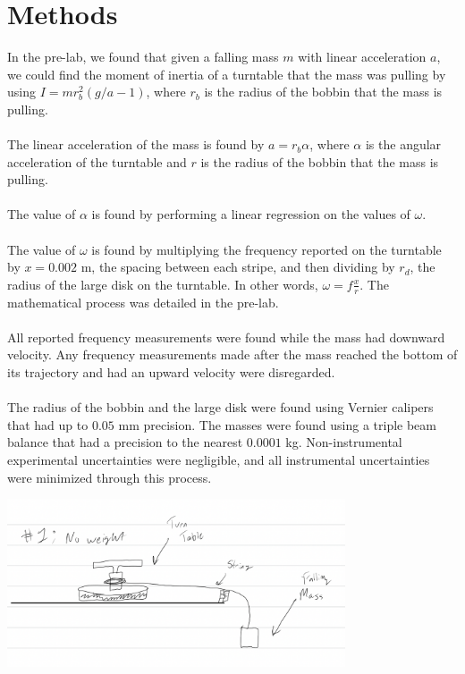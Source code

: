 \documentclass[9pt]{extarticle}
\begin{document}
{\section*{Methods}
In the pre-lab, we found that given a falling mass $m$ with linear acceleration $a$, we could find the moment of inertia of a turntable that the mass was pulling by using $I = mr_b^2(g/a-1)$, where $r_b$ is the radius of the bobbin that the mass is pulling. \\
\\
The linear acceleration of the mass is found by $a = r_b\alpha$, where $\alpha$ is the angular acceleration of the turntable and $r$ is the radius of the bobbin that the mass is pulling.\\
\\
The value of $\alpha$ is found by performing a linear regression on the values of $\omega$.\\
\\
The value of $\omega$ is found by multiplying the frequency reported on the turntable by $x = 0.002$ m, the spacing between each stripe, and then dividing by $r_d$, the radius of the large disk on the turntable. In other words, $\omega = f \frac{x}{r}$. The mathematical process was detailed in the pre-lab.\\
\\
All reported frequency measurements were found while the mass had downward velocity. Any frequency measurements made after the mass reached the bottom of its trajectory and had an upward velocity were disregarded. \\
\\
The radius of the bobbin and the large disk were found using Vernier calipers that had up to $0.05$ mm precision. The masses were found using a triple beam balance that had a precision to the nearest $0.0001$ kg. Non-instrumental experimental uncertainties were negligible, and all instrumental uncertainties were minimized through this process.
\begin{center}
	\includegraphics[width=10cm]{images/Lab8Image3_1.png} \\

\end{center}}
\end{document}
